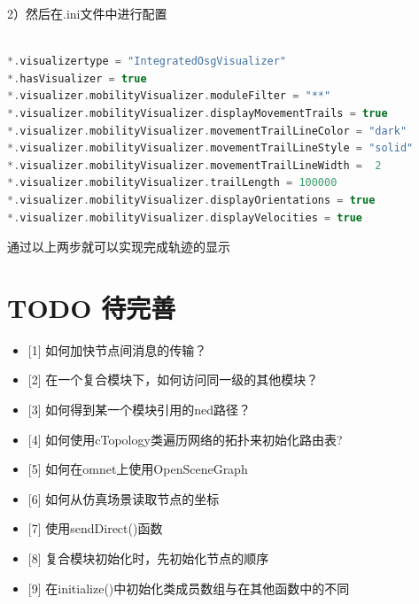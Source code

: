 2）然后在.ini文件中进行配置

\begin{lstlisting}[language=c]

*.visualizertype = "IntegratedOsgVisualizer"
*.hasVisualizer = true
*.visualizer.mobilityVisualizer.moduleFilter = "**"
*.visualizer.mobilityVisualizer.displayMovementTrails = true
*.visualizer.mobilityVisualizer.movementTrailLineColor = "dark"
*.visualizer.mobilityVisualizer.movementTrailLineStyle = "solid"
*.visualizer.mobilityVisualizer.movementTrailLineWidth =  2
*.visualizer.mobilityVisualizer.trailLength = 100000
*.visualizer.mobilityVisualizer.displayOrientations = true
*.visualizer.mobilityVisualizer.displayVelocities = true

\end{lstlisting}

通过以上两步就可以实现完成轨迹的显示

\chapter{TODO 待完善}
\label{todo待完善}

\begin{itemize}
\item {[1]} 如何加快节点间消息的传输？

\item {[2]} 在一个复合模块下，如何访问同一级的其他模块？

\item {[3]} 如何得到某一个模块引用的ned路径？

\item {[4]} 如何使用cTopology类遍历网络的拓扑来初始化路由表?

\item {[5]} 如何在omnet上使用OpenSceneGraph

\item {[6]} 如何从仿真场景读取节点的坐标

\item {[7]} 使用sendDirect()函数

\item {[8]} 复合模块初始化时，先初始化节点的顺序

\item {[9]} 在initialize()中初始化类成员数组与在其他函数中的不同

\end{itemize}
